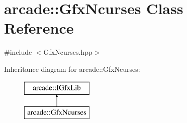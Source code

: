 \hypertarget{classarcade_1_1_gfx_ncurses}{}\section{arcade\+:\+:Gfx\+Ncurses Class Reference}
\label{classarcade_1_1_gfx_ncurses}


{\ttfamily \#include $<$Gfx\+Ncurses.\+hpp$>$}

Inheritance diagram for arcade\+:\+:Gfx\+Ncurses\+:\begin{figure}[H]
\begin{center}
\leavevmode
\includegraphics[height=2.000000cm]{classarcade_1_1_gfx_ncurses}
\end{center}
\end{figure}
